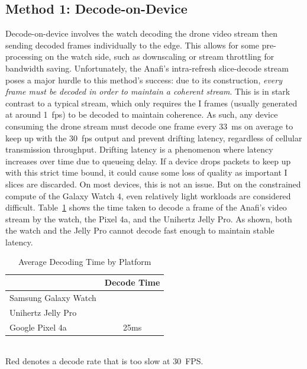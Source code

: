 \subsection{Method 1: Decode-on-Device}
\label{sec:method-1}
Decode-on-device involves the watch decoding the drone video stream then sending decoded frames individually to the edge. This allows for some pre-processing on the watch side, such as downscaling or stream throttling for bandwidth saving. Unfortunately, the Anafi's intra-refresh slice-decode stream poses a major hurdle to this method's success: due to its construction, \textit{every frame must be decoded in order to maintain a coherent stream}. This is in stark contrast to a typical stream, which only requires the I frames (usually generated at around 1~fps) to be decoded to maintain coherence. As such, any device consuming the drone stream must decode one frame every 33~ms on average to keep up with the 30~fps output and prevent drifting latency, regardless of cellular transmission throughput. Drifting latency is a phenomenon where latency increases over time due to queueing delay. If a device drops packets to keep up with this strict time bound, it could cause some loss of quality as important I slices are discarded. On most devices, this is not an issue. But on the constrained compute of the Galaxy Watch 4, even relatively light workloads are considered difficult. Table~\ref{tab:decoding-time} shows the time taken to decode a frame of the Anafi's video stream by the watch, the Pixel 4a, and the Unihertz Jelly Pro. As shown, both the watch and the Jelly Pro cannot decode fast enough to maintain stable latency.

\begin{table}
        \centering
        \begin{tabular}{|l|c|}
                \hline
                & Decode Time \\
                \hline
                Samsung Galaxy Watch & \color{red}{55ms} \\
                Unihertz Jelly Pro & \color{red}{35ms} \\
                Google Pixel 4a & 25ms \\
                \hline
        \end{tabular}
        \begin{captext}
                \centering
                \\[0.1cm] \small \color{red}Red denotes a decode rate that is  too slow at 30~FPS.
        \end{captext}
        \caption{Average Decoding Time by Platform}
        \label{tab:decoding-time}
\end{table}

